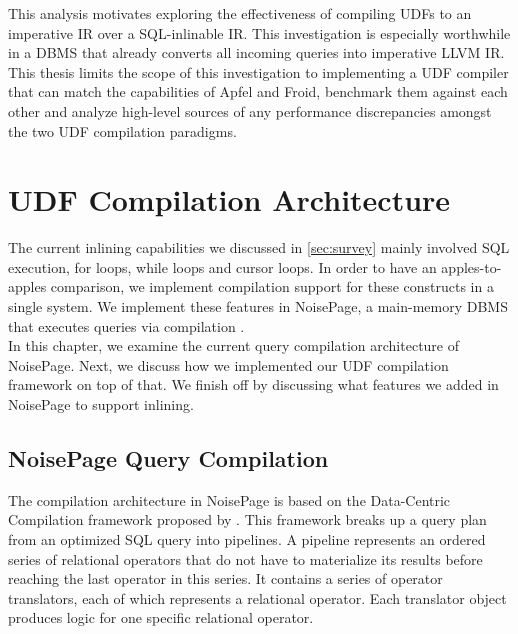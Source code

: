 \documentclass[12pt]{cmuthesis}
\newcommand{\sysname}{NoisePage\xspace}
\begin{document}
This analysis motivates exploring the effectiveness of compiling UDFs to an imperative IR over a SQL-inlinable IR. This investigation is especially worthwhile in a DBMS that already converts all incoming queries into imperative LLVM IR. This thesis limits the scope of this investigation to implementing a UDF compiler that can match the capabilities of Apfel and Froid, benchmark them against each other and analyze high-level sources of any performance discrepancies amongst the two UDF compilation paradigms.\\


\chapter{UDF Compilation Architecture}
\label{sec:architecture}
The current inlining capabilities we discussed in \cref{sec:survey} mainly involved SQL execution, for loops, while loops and cursor loops. In order to have an apples-to-apples comparison, we implement 
compilation support for these constructs in a single system. We implement these features in \sysname, a main-memory DBMS that executes queries via compilation \cite{noisepage}.\\

In this chapter, we examine the current query compilation architecture of \sysname. Next, we discuss how we implemented our UDF compilation framework on top of that. We finish off by discussing what features we added in \sysname to support inlining.

\section{\sysname Query Compilation}
\label{sec:querycomp}
The compilation architecture in \sysname is based on the Data-Centric Compilation framework proposed by \citeauthor{neumann11} \cite{neumann11}. This framework breaks up a query plan from an optimized SQL query into pipelines. A pipeline represents an ordered series of relational operators that do not have to materialize its results before reaching the last operator in this series. It contains a series of operator translators, each of which represents a relational operator. Each translator object produces logic for one specific relational operator.\\
\end{document}
